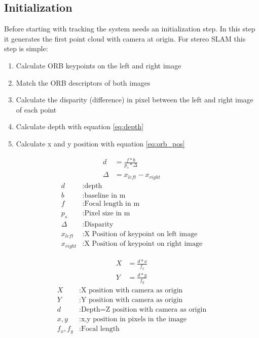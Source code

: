 \documentclass[11pt,a4paper,titlepage,oneside]{report}
\begin{document}
\subsection{Initialization}

Before starting with tracking the system needs an initialization step. In this step it generates the first point cloud with camera at origin. For stereo SLAM this step is simple:
\begin{enumerate}
	\item Calculate ORB keypoints on the left and right image
	\item Match the ORB descriptors of both images
	\item Calculate the disparity (difference) in pixel between the left and right image of each point
	\item Calculate depth with equation \ref{eq:depth}
	\item Calculate x and y position with equation \ref{eq:orb_pos}
\end{enumerate}	

\begin{equation}\label{eq:depth}
\begin{aligned}
	d&=\frac{f*b}{p_s*\Delta}\\
	\Delta&=x_{left}-x_{right}
\end{aligned}
\end{equation}
\begin{align*}
	d &:					\text{depth}\\
	b &:					\text{baseline in m}\\
	f &:					\text{Focal length in m}\\
	p_s	&:				\text{Pixel size in m}\\
	\Delta &:			\text{Disparity}\\
	x_{left} &:		\text{X Position of keypoint on left image}\\
	x_{right} &: 	\text{X Position of keypoint on right image}
\end{align*}

\begin{equation}\label{eq:orb_pos}
\begin{aligned}
	X&=\frac{d*x}{f_x}\\
	Y&=\frac{d*y}{f_y}
\end{aligned}
\end{equation}
\begin{align*}
	X &:				\text{X position with camera as origin}\\
	Y &: 				\text{Y position with camera as origin}\\
	d &: 				\text{Depth=Z position with camera as origin}\\
	x,y &:			\text{x,y position in pixels in the image}\\
	f_x,f_y &:	\text{Focal length}
\end{align*}
\end{document}
